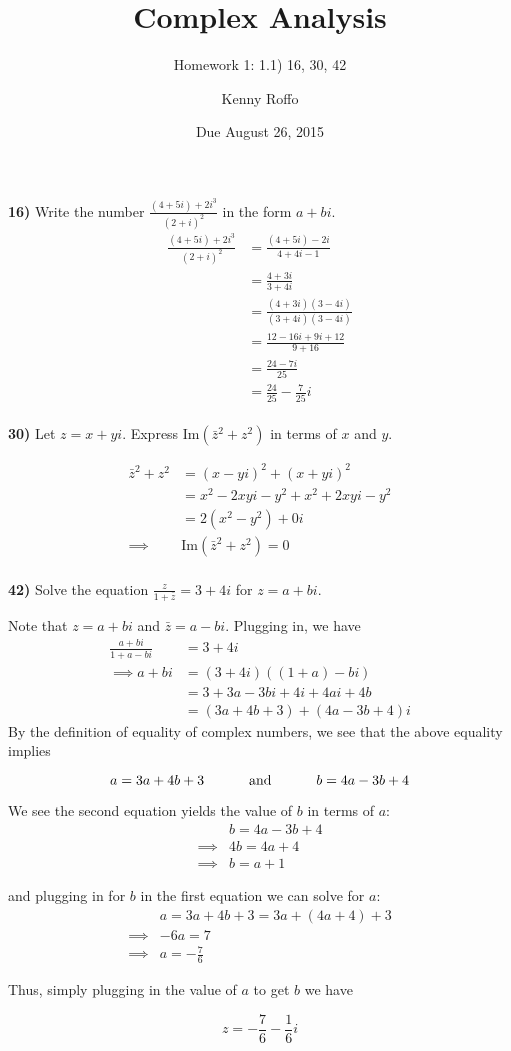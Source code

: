 \documentclass{scrartcl}
\title{Complex Analysis}
\subtitle{Homework 1: 1.1) 16, 30, 42}
\author{Kenny Roffo}
\date{Due August 26, 2015}
\begin{document}
\maketitle
\textbf{16)} Write the number $\frac{(4+5i)+2i^3}{(2+i)^2}$ in the form $a+bi$.\\

\begin{align*}
  \frac{(4+5i)+2i^3}{(2+i)^2} &= \frac{(4 + 5i) - 2i}{4 + 4i - 1}\\
  &= \frac{4+3i}{3+4i}\\
  &= \frac{(4+3i)(3-4i)}{(3+4i)(3-4i)}\\
  &= \frac{12-16i+9i+12}{9+16}\\
  &= \frac{24-7i}{25}\\
  &= \frac{24}{25}-\frac{7}{25}i
\end{align*}\\

\textbf{30)} Let $z=x+yi$. Express $\text{Im}(\bar{z}^2 + z^2)$ in terms of $x$ and $y$.

\begin{align*}
  \bar{z}^2 + z^2 &= (x-yi)^2 + (x+yi)^2\\
  &= x^2 - 2xyi - y^2 + x^2 + 2xyi - y^2\\
  &= 2(x^2 - y^2) + 0i\\
  \implies &\text{Im}(\bar{z}^2 + z^2) = 0
\end{align*}\\

\pagebreak
\textbf{42)} Solve the equation $\frac{z}{1+\bar{z}}=3+4i$ for $z=a+bi$.

Note that $z=a+bi$ and $\bar{z}=a-bi$. Plugging in, we have
\begin{align*}
  \frac{a+bi}{1+a-bi} &= 3+4i\\
  \implies a+bi &= (3+4i)((1+a)-bi)\\
  &= 3+3a-3bi+4i+4ai+4b\\
  &= (3a+4b+3)+(4a-3b+4)i
\end{align*}
By the definition of equality of complex numbers, we see that the above equality implies

$$a=3a+4b+3 \text{\hspace{0.4in} and \hspace{0.4in}} b=4a-3b+4$$

We see the second equation yields the value of $b$ in terms of $a$:
\begin{align*}
  &b = 4a-3b+4\\
  \implies &4b = 4a+4\\
  \implies &b = a+1
\end{align*}

and plugging in for $b$ in the first equation we can solve for $a$:
\begin{align*}
  &a = 3a+4b+3 = 3a+(4a+4)+3\\
  \implies &-6a = 7\\
  \implies &a = -\frac{7}{6}
\end{align*}

Thus, simply plugging in the value of $a$ to get $b$ we have

$$z=-\frac{7}{6}-\frac{1}{6}i$$
\end{document}
